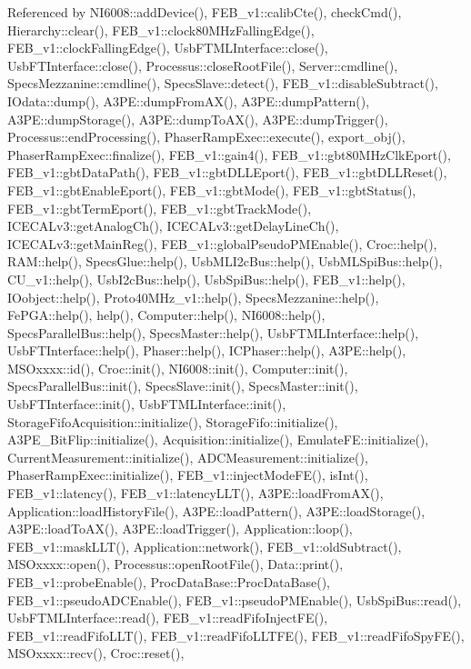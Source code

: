 Referenced by N\+I6008\+::add\+Device(), F\+E\+B\+\_\+v1\+::calib\+Cte(), check\+Cmd(), Hierarchy\+::clear(), F\+E\+B\+\_\+v1\+::clock80\+M\+Hz\+Falling\+Edge(), F\+E\+B\+\_\+v1\+::clock\+Falling\+Edge(), Usb\+F\+T\+M\+L\+Interface\+::close(), Usb\+F\+T\+Interface\+::close(), Processus\+::close\+Root\+File(), Server\+::cmdline(), Specs\+Mezzanine\+::cmdline(), Specs\+Slave\+::detect(), F\+E\+B\+\_\+v1\+::disable\+Subtract(), I\+Odata\+::dump(), A3\+P\+E\+::dump\+From\+A\+X(), A3\+P\+E\+::dump\+Pattern(), A3\+P\+E\+::dump\+Storage(), A3\+P\+E\+::dump\+To\+A\+X(), A3\+P\+E\+::dump\+Trigger(), Processus\+::end\+Processing(), Phaser\+Ramp\+Exec\+::execute(), export\+\_\+obj(), Phaser\+Ramp\+Exec\+::finalize(), F\+E\+B\+\_\+v1\+::gain4(), F\+E\+B\+\_\+v1\+::gbt80\+M\+Hz\+Clk\+Eport(), F\+E\+B\+\_\+v1\+::gbt\+Data\+Path(), F\+E\+B\+\_\+v1\+::gbt\+D\+L\+L\+Eport(), F\+E\+B\+\_\+v1\+::gbt\+D\+L\+L\+Reset(), F\+E\+B\+\_\+v1\+::gbt\+Enable\+Eport(), F\+E\+B\+\_\+v1\+::gbt\+Mode(), F\+E\+B\+\_\+v1\+::gbt\+Status(), F\+E\+B\+\_\+v1\+::gbt\+Term\+Eport(), F\+E\+B\+\_\+v1\+::gbt\+Track\+Mode(), I\+C\+E\+C\+A\+Lv3\+::get\+Analog\+Ch(), I\+C\+E\+C\+A\+Lv3\+::get\+Delay\+Line\+Ch(), I\+C\+E\+C\+A\+Lv3\+::get\+Main\+Reg(), F\+E\+B\+\_\+v1\+::global\+Pseudo\+P\+M\+Enable(), Croc\+::help(), R\+A\+M\+::help(), Specs\+Glue\+::help(), Usb\+M\+L\+I2c\+Bus\+::help(), Usb\+M\+L\+Spi\+Bus\+::help(), C\+U\+\_\+v1\+::help(), Usb\+I2c\+Bus\+::help(), Usb\+Spi\+Bus\+::help(), F\+E\+B\+\_\+v1\+::help(), I\+Oobject\+::help(), Proto40\+M\+Hz\+\_\+v1\+::help(), Specs\+Mezzanine\+::help(), Fe\+P\+G\+A\+::help(), help(), Computer\+::help(), N\+I6008\+::help(), Specs\+Parallel\+Bus\+::help(), Specs\+Master\+::help(), Usb\+F\+T\+M\+L\+Interface\+::help(), Usb\+F\+T\+Interface\+::help(), Phaser\+::help(), I\+C\+Phaser\+::help(), A3\+P\+E\+::help(), M\+S\+Oxxxx\+::id(), Croc\+::init(), N\+I6008\+::init(), Computer\+::init(), Specs\+Parallel\+Bus\+::init(), Specs\+Slave\+::init(), Specs\+Master\+::init(), Usb\+F\+T\+Interface\+::init(), Usb\+F\+T\+M\+L\+Interface\+::init(), Storage\+Fifo\+Acquisition\+::initialize(), Storage\+Fifo\+::initialize(), A3\+P\+E\+\_\+\+Bit\+Flip\+::initialize(), Acquisition\+::initialize(), Emulate\+F\+E\+::initialize(), Current\+Measurement\+::initialize(), A\+D\+C\+Measurement\+::initialize(), Phaser\+Ramp\+Exec\+::initialize(), F\+E\+B\+\_\+v1\+::inject\+Mode\+F\+E(), is\+Int(), F\+E\+B\+\_\+v1\+::latency(), F\+E\+B\+\_\+v1\+::latency\+L\+L\+T(), A3\+P\+E\+::load\+From\+A\+X(), Application\+::load\+History\+File(), A3\+P\+E\+::load\+Pattern(), A3\+P\+E\+::load\+Storage(), A3\+P\+E\+::load\+To\+A\+X(), A3\+P\+E\+::load\+Trigger(), Application\+::loop(), F\+E\+B\+\_\+v1\+::mask\+L\+L\+T(), Application\+::network(), F\+E\+B\+\_\+v1\+::old\+Subtract(), M\+S\+Oxxxx\+::open(), Processus\+::open\+Root\+File(), Data\+::print(), F\+E\+B\+\_\+v1\+::probe\+Enable(), Proc\+Data\+Base\+::\+Proc\+Data\+Base(), F\+E\+B\+\_\+v1\+::pseudo\+A\+D\+C\+Enable(), F\+E\+B\+\_\+v1\+::pseudo\+P\+M\+Enable(), Usb\+Spi\+Bus\+::read(), Usb\+F\+T\+M\+L\+Interface\+::read(), F\+E\+B\+\_\+v1\+::read\+Fifo\+Inject\+F\+E(), F\+E\+B\+\_\+v1\+::read\+Fifo\+L\+L\+T(), F\+E\+B\+\_\+v1\+::read\+Fifo\+L\+L\+T\+F\+E(), F\+E\+B\+\_\+v1\+::read\+Fifo\+Spy\+F\+E(), M\+S\+Oxxxx\+::recv(), Croc\+::reset(), 
